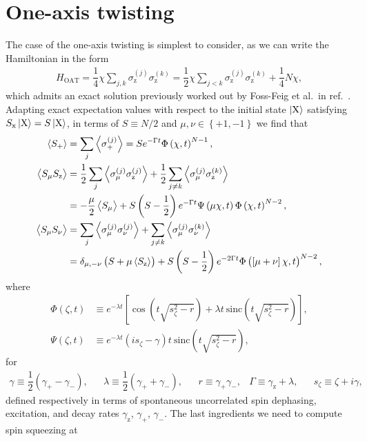 \documentclass[aps,notitlepage,nofootinbib,11pt]{revtex4-1}
\renewcommand{\t}{\text} %
\newcommand{\f}[2]{\dfrac{#1}{#2}} %
\newcommand{\p}[1]{\left(#1\right)} %
\renewcommand{\sp}[1]{\left[#1\right]} %
\renewcommand{\set}[1]{\left\{#1\right\}} %
\newcommand{\bk}{\Braket} %
\newcommand{\z}{\text{z}}
\newcommand{\x}{\text{x}}
\newcommand{\X}{\text{X}}
\newcommand{\1}{\mathds{1}}
\begin{document}
\section{One-axis twisting}

The case of the one-axis twisting is simplest to consider, as we can
write the Hamiltonian in the form
\begin{align}
  H_{\t{OAT}} = \f14 \chi \sum_{j,k} \sigma_\z^{(j)} \sigma_\z^{(k)}
  = \f12 \chi \sum_{j<k} \sigma_\z^{(j)} \sigma_\z^{(k)} + \f14 N \chi,
\end{align}
which admits an exact solution previously worked out by Foss-Feig et
al.~in ref.~\cite{foss-feig2013nonequilibrium}.  Adapting exact
expectation values with respect to the initial state $\ket{\X}$
satisfying $S_\x\ket{\X}=S\ket{\X}$, in terms of $S\equiv N/2$ and
$\mu,\nu\in\set{+1,-1}$ we find that
\begin{align}
  \bk{S_+}
  &= \sum_j\bk{\sigma_+^{(j)}}
  = S e^{-\Gamma t} \Phi\p{\chi,t}^{N-1}, \label{eq:S+_OAT} \\
  \bk{S_\mu S_\z}
  &= \f12\sum_j\bk{\sigma_\mu^{(j)}\sigma_\z^{(j)}}
  + \f12\sum_{j\ne k} \bk{\sigma_\mu^{(j)} \sigma_\z^{(k)}} \\
  &= -\f{\mu}{2}\bk{S_\mu} + S \p{S-\f12} e^{-\Gamma t}
  \Psi\p{\mu\chi,t} \Phi\p{\chi,t}^{N-2}, \\
  \bk{S_\mu S_\nu}
  &= \sum_j \bk{\sigma_\mu^{(j)} \sigma_\nu^{(j)}}
  + \sum_{j\ne k} \bk{\sigma_\mu^{(j)} \sigma_\nu^{(k)}} \\
  &= \delta_{\mu,-\nu} \p{S + \mu\bk{S_\z}}
  + S \p{S-\f12} e^{-2\Gamma t}
  \Phi\p{\sp{\mu+\nu}\chi,t}^{N-2}, \label{eq:SS+-_OAT}
\end{align}
where
\begin{align}
  \Phi\p{\zeta,t}
  &\equiv e^{-\lambda t} \sp{\cos\p{t\sqrt{s_\zeta^2-r}}
    + \lambda t~\t{sinc}\p{t\sqrt{s_\zeta^2-r}}},
  \\
  \Psi\p{\zeta,t}
  &\equiv e^{-\lambda t} \p{is_\zeta-\gamma}t~
  \t{sinc}\p{t\sqrt{s_\zeta^2-r}},
\end{align}
for
\begin{align}
  \gamma \equiv \f12 \p{\gamma_+ - \gamma_-},
  &&
  \lambda \equiv \f12 \p{\gamma_+ + \gamma_-},
  &&
  r \equiv \gamma_+ \gamma_-,
  &
  \Gamma \equiv \gamma_\z + \lambda,
  &&
  s_\zeta \equiv \zeta + i\gamma,
\end{align}
defined respectively in terms of spontaneous uncorrelated spin
dephasing, excitation, and decay rates $\gamma_\z$, $\gamma_+$,
$\gamma_-$.  The last ingredients we need to compute spin squeezing at
\end{document}

